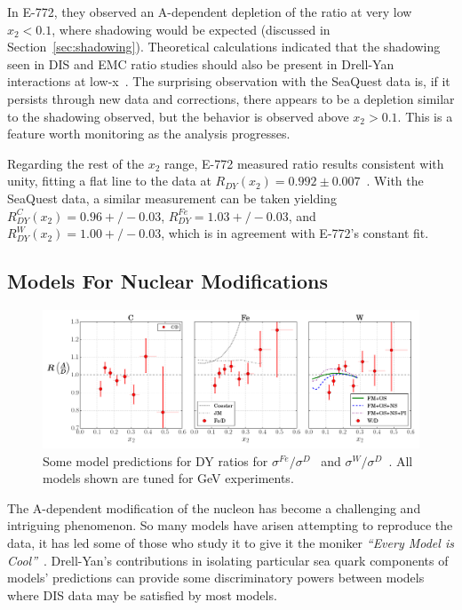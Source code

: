 In E-772, they observed an A-dependent depletion of the ratio at very low $x_2<0.1$, where shadowing would be expected (discussed in Section~\ref{sec:shadowing}). Theoretical calculations indicated that the shadowing seen in DIS and EMC ratio studies should also be present in Drell-Yan interactions at low-x~\cite{Brodsky:1996nj}. The surprising observation with the SeaQuest data is, if it persists through new data and corrections, there appears to be a depletion similar to the shadowing observed, but the behavior is observed above $x_2>0.1$. This is a feature worth monitoring as the analysis progresses.

Regarding the rest of the $x_2$ range, E-772 measured ratio results consistent with unity, fitting a flat line to the data at $R_{DY}(x_2)=0.992\pm0.007$~\cite{Wang:1991wa}. With the SeaQuest data, a similar measurement can be taken yielding $R^C_{DY}(x_2) = 0.96 +/- 0.03$, $R^{Fe}_{DY} = 1.03 +/- 0.03$, and $R^W_{DY}(x_2) = 1.00 +/- 0.03$, which is in agreement with E-772's constant fit.

\subsection{Models For Nuclear Modifications}

\begin{figure}
	\centering
	\includegraphics[width=\textwidth]{figures/results/xt-emc-models.png}
	\caption{Some model predictions for DY ratios for $\sigma^{Fe}/\sigma^D$~\cite{Jung:1990pu} and $\sigma^{W}/\sigma^D$~\cite{Kulagin:2015lkm}. All models shown are tuned for \unit[800]{GeV} experiments.}
	\label{fig:xt-emc-models}
\end{figure}

The A-dependent modification of the nucleon has become a challenging and intriguing phenomenon. So many models have arisen attempting to reproduce the data, it has led some of those who study it to give it the moniker \emph{``Every Model is Cool''}~\cite{Miller:1988hj}. Drell-Yan's contributions in isolating particular sea quark components of models' predictions can provide some discriminatory powers between models where DIS data may be satisfied by most models.

